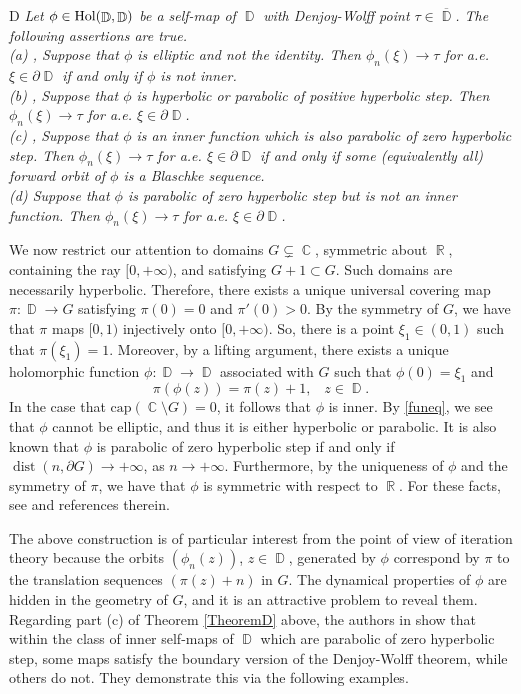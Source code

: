 \documentclass[11pt, letterpaper,leqno]{amsart}
\numberwithin{equation}{section}
\theoremstyle{definition}
\DeclareMathOperator{\D}{\mathbb{D}}
\DeclareMathOperator{\C}{\mathbb{C}}
\DeclareMathOperator{\R}{\mathbb{R}}
\DeclareMathOperator{\dist}{\mathrm{dist}}
\begin{document}
\begin{customthm}{D}\label{TheoremD}
	\textit{ Let $\phi\in\rm{Hol}(\D, \D)$ be a self-map of $\D$ with Denjoy-Wolff point $\tau\in\overline{\D}$. The following assertions are true.\\
	{\rm (a)} \cite{BMS}, \cite{P-C} Suppose that $\phi$ is elliptic and not the identity. Then $\phi_n(\xi)\to \tau$ for a.e. $\xi\in\partial\D$ if and only if $\phi$ is not inner.\\
	{\rm (b)} \cite{BMS}, \cite{P-C} Suppose that $\phi$ is hyperbolic or parabolic of positive hyperbolic step. Then $\phi_n(\xi)\to \tau$ for a.e. $\xi\in\partial\D$.\\
	{\rm (c)} \cite{BMS}, \cite{P-C} Suppose that $\phi$ is an inner function which is also parabolic of zero hyperbolic step. Then $\phi_n(\xi)\to \tau$ for a.e. $\xi\in\partial\D$ if and only if some (equivalently all) forward orbit of $\phi$ is a Blaschke sequence.\\
	{\rm (d)} \cite{BCD} Suppose that $\phi$ is parabolic of zero hyperbolic step but is not an inner function. Then $\phi_n(\xi)\to \tau$ for a.e. $\xi\in\partial\D$.
	}
\end{customthm}

We now restrict our attention to domains $G\subsetneq\C$, symmetric about $\R$, containing the ray $[0,+\infty)$, and satisfying $G+1\subset G$. Such domains are necessarily hyperbolic. Therefore, there exists a unique universal covering map $\pi:\D\to G$ satisfying $\pi(0)=0$ and $\pi'(0)>0$. By the symmetry of $G$, we have that $\pi$ maps $[0,1)$ injectively onto $[0,+\infty)$. So, there is a point $\xi_1\in (0,1)$ such that $\pi(\xi_1)=1$. Moreover, by a lifting argument, there exists a unique holomorphic function $\phi:\D\to \D$ associated with $G$ such that $\phi(0)=\xi_1$ and 
\begin{equation}\label{funeq}
	\pi(\phi(z))=\pi(z)+1,\;\;\;z\in\D.
\end{equation}
  In the case that $\text{cap}(\C\setminus G)=0$, it follows that $\phi$ is inner. By \eqref{funeq}, we see that $\phi$ cannot be elliptic, and thus it is either hyperbolic or parabolic. It is also known that $\phi$ is parabolic of zero hyperbolic step if and only if $\dist(n,\partial G)\to +\infty$, as $n\to +\infty$. Furthermore, by the uniqueness of $\phi$ and the symmetry of $\pi$, we have that $\phi$ is symmetric with respect to $\R$. For these facts, see \cite[Theorems 8.1 and 8.2]{CDP} and references therein. 
  
  The above construction is of particular interest from the point of view of iteration theory because the orbits $(\phi_n(z))$, $z\in\D$, generated by $\phi$ correspond by $\pi$ to the translation sequences $(\pi(z)+n)$ in $G$. The dynamical properties of $\phi$  are hidden in the geometry of $G$, and it is an attractive problem to reveal them. 
  Regarding part (c) of Theorem \ref{TheoremD} above, the authors in \cite{CDP} show that within the class of inner self-maps of $\D$ which are parabolic of zero hyperbolic step, some maps satisfy the boundary version of the Denjoy-Wolff theorem, while others do not. They demonstrate this via the following examples.
  
\end{document}
